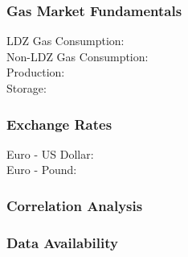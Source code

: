 \subsubsection{Gas Market Fundamentals}
\begin{description}
\item[LDZ Gas Consumption:]
\item[Non-LDZ Gas Consumption:]
\item[Production:]
\item[Storage:]
\end{description}
\subsubsection{Exchange Rates}
\begin{description}
\item[Euro - US Dollar:]
\item[Euro - Pound:]
\end{description}
\subsubsection{Correlation Analysis}
\subsubsection{Data Availability}